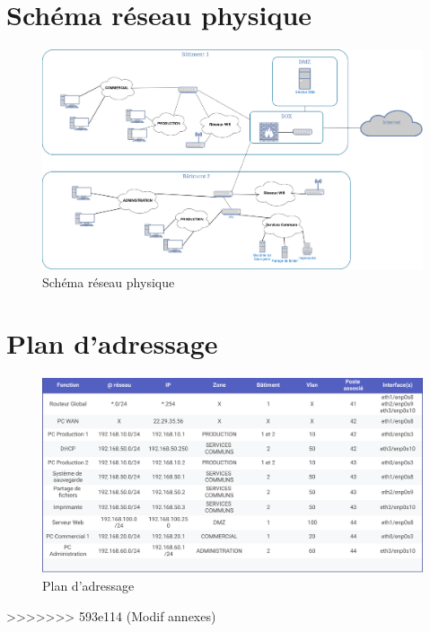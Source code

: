 \documentclass[a4paper,12pt,openany]{report}
\begin{document}
\begin{appendices}
        \chapter{Schéma réseau physique}
            \begin{figure}[H]
                \centering
                \includegraphics[width=1.2\textwidth]{Images/Schema_physique.jpg}
                \caption{Schéma réseau physique}
            \end{figure}
        \chapter{Plan d'adressage}
            \begin{figure}[H]
                \centering
                \includegraphics[width=1.2\textwidth]{Images/Plan_adressage.pdf}
                \caption{Plan d'adressage}
            \end{figure}
    \end{appendices}
>>>>>>> 593e114 (Modif annexes)
        
\end{document}
